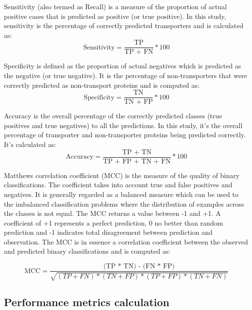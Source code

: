     Sensitivity (also termed as Recall) is a measure of the proportion of actual positive cases that is 
    predicted as positive (or true positive). In this study, sensitivity is the percentage of correctly predicted transporters 
    and is calculated as:
    \begin{equation}
        \text{Sensitivity} = \frac {\text{TP}}{\text{TP + FN}} * 100
    \end{equation}

    Specificity is defined as the proportion of actual negatives which is predicted as the negative (or true negative). It is  
    the percentage of non-transporters that were correctly predicted as non-transport proteins and is computed as:
    \begin{equation}
        \text{Specificity} = \frac {\text{TN}}{\text{TN + FP}} * 100
    \end{equation}

    Accuracy is the overall percentage of the correctly predicted classes (true positives and true negatives) to all the 
    predictions. In this study, it's the overall percentage of transporter and non-transporter proteins 
    being predicted correctly. It's calculated as:
    \begin{equation}
        \text{Accuracy} = \frac {\text{TP + TN}}{\text{TP + FP + TN + FN}} * 100
    \end{equation}

    Matthews correlation coefficient (MCC) is the measure of the quality of binary classifications. 
    The coefficient takes into account true 
    and false positives and negatives. It is generally regarded as a balanced measure which can be used to 
    the imbalanced classification problems where the distribution of examples across the classes is not equal.\cite{mcc2017optimal}
    The MCC returns a value between -1 and +1. A coefficient of +1 represents a perfect prediction, 0 no better than 
    random prediction and -1 indicates total disagreement between prediction and observation. The MCC is in 
    essence a correlation coefficient between the observed and predicted binary classifications and is computed as:
    
    \begin{equation}
        \text{MCC} = \frac {\text{(TP * TN) - (FN * FP)}}{\sqrt{(TP + FN) * (TN + FP) * (TP + FP) * (TN + FN)}}
    \end{equation}

    \subsection{Performance metrics calculation}
